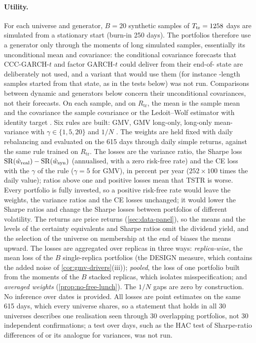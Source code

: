 \paragraph{Utility.}
For each universe and generator, $B=20$ synthetic samples of $T_{\mathrm{tr}}=1258$ days are simulated from a
stationary start (burn-in 250 days). The portfolios therefore use a generator only through the
moments of long simulated samples, essentially its unconditional mean and covariance: the
conditional covariance forecasts that CCC-GARCH-$t$ and factor GARCH-$t$ could deliver from their
end-of-\TRAIN{} state are deliberately not used, and a variant that would use them (for instance
\TEST{}-length samples started from that state, as in the tests below) was not run. Comparisons
between dynamic and \iid{} generators below concern their unconditional covariances, not their
forecasts. On each sample, and on $R_{\mathrm{tr}}$, the mean is the sample mean and the
covariance the sample covariance or the Ledoit--Wolf estimator with identity target
\citep{ledoit2004well}. Six rules are built: GMV, GMV long-only, long-only mean-variance with
$\gamma\in\{1,5,20\}$ and $1/N$ \citep{demiguel2009optimal}. The weights are held fixed with daily
rebalancing and evaluated on the 615 \TEST{} days through daily simple returns, against the same
rule trained on $R_{\mathrm{tr}}$. The losses are the variance ratio, the Sharpe loss
$\mathrm{SR}(\hat w_{\mathrm{real}})-\mathrm{SR}(\hat w_{\mathrm{syn}})$ (annualised, with a zero risk-free
rate) and the CE loss with the $\gamma$ of the rule ($\gamma=5$ for GMV), in percent per
year ($252\times100$ times the daily value); ratios above one and positive losses mean that TSTR
is worse. Every portfolio is fully invested, so a positive risk-free rate would leave the weights,
the variance ratios and the CE losses unchanged; it would lower the Sharpe ratios and change the
Sharpe losses between portfolios of different volatility. The returns are price returns
(\cref{sec:data-panel}), so the \TRAIN{} means and the levels of the certainty equivalents and
Sharpe ratios omit the dividend yield, and the selection of the universe on membership at the end
of \TEST{} biases the \TRAIN{} means upward. The losses are aggregated over
replicas in three ways: \emph{replica-wise}, the mean loss of the $B$ single-replica portfolios
(the DESIGN measure, which contains the added noise of \cref{cor:gmv-drivers}(iii));
\emph{pooled}, the loss of one portfolio built from the moments of the $B$ stacked replicas, which
isolates misspecification; and \emph{averaged weights} (\cref{prop:no-free-lunch}). The $1/N$
gaps are zero by construction. No inference over dates is provided. All losses are point
estimates on the same 615 \TEST{} days, which every universe shares, so a statement that holds in
all 30 universes describes one realisation seen through 30 overlapping portfolios, not 30
independent confirmations; a test over \TEST{} days, such as the HAC test of Sharpe-ratio
differences of \citet{ledoit2008robust} or its analogue for variances, was not run.

